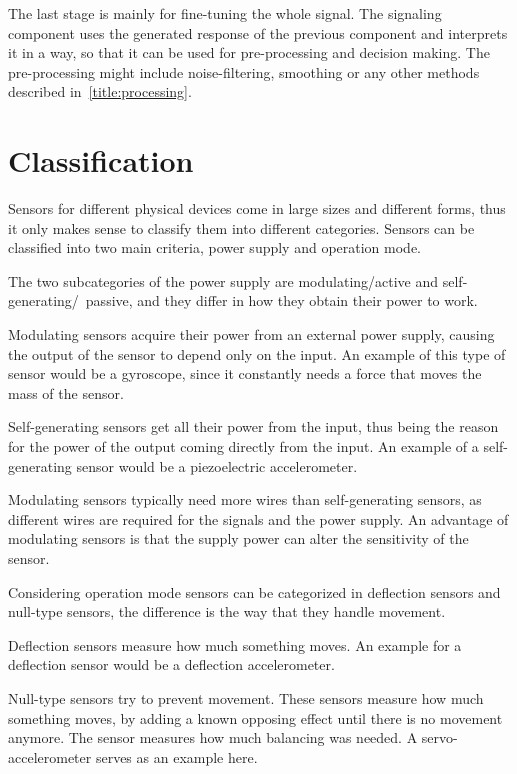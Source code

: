 The last stage is mainly for fine-tuning the whole signal. The signaling component uses the generated response of the previous component and interprets it in a way, so that it can be used for pre-processing and decision making. The pre-processing might include noise-filtering, smoothing or any other methods described in\ \autoref{title:processing}.

\noindent\cite{LRWeb:59}

\section{Classification}
Sensors for different physical devices come in large sizes and different forms, thus it only makes sense to classify them into different categories. Sensors can be classified into two main criteria, power supply and operation mode.

The two subcategories of the power supply are modulating/active and self-generating/\ passive, and they differ in how they obtain their power to work.

Modulating sensors acquire their power from an external power supply, causing the output of the sensor to depend only on the input. An example of this type of sensor would be a gyroscope, since it constantly needs a force that moves the mass of the sensor.

Self-generating sensors get all their power from the input, thus being the reason for the power of the output coming directly from the input. An example of a self-generating sensor would be a piezoelectric accelerometer.

Modulating sensors typically need more wires than self-generating sensors, as different wires are required for the signals and the power supply. An advantage of modulating sensors is that the supply power can alter the sensitivity of the sensor.

Considering operation mode sensors can be categorized in deflection sensors and null-type sensors, the difference is the way that they handle movement.

Deflection sensors measure how much something moves. An example for a deflection sensor would be a deflection accelerometer.

Null-type sensors try to prevent movement. These sensors measure how much something moves, by adding a known opposing effect until there is no movement anymore. The sensor measures how much balancing was needed. A servo-accelerometer serves as an example here. 

